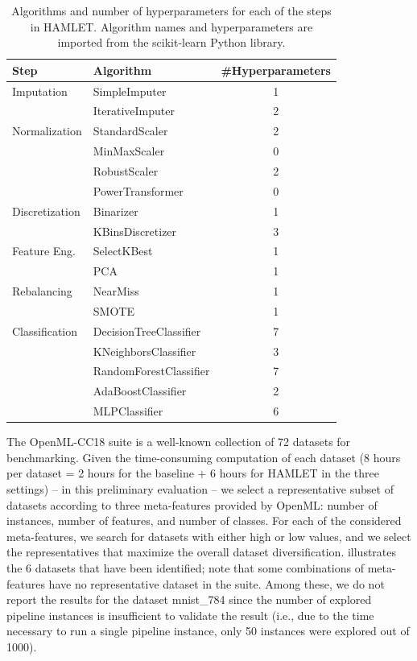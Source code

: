 \begin{table}[t]
    \footnotesize
    \caption{Algorithms and number of hyperparameters for each of the steps in HAMLET. Algorithm names and hyperparameters are imported from the scikit-learn Python library.}
    \centering
    \begin{tabular}{llc}
        \toprule
        \textbf{Step} & \textbf{Algorithm} & \textbf{\#Hyperparameters}  \\\midrule
        Imputation        & SimpleImputer & 1 \\
                          & IterativeImputer & 2 \\
        Normalization     & StandardScaler & 2 \\
                          & MinMaxScaler & 0 \\
                          & RobustScaler & 2 \\
                          & PowerTransformer & 0 \\
        Discretization    & Binarizer & 1 \\
                          & KBinsDiscretizer & 3 \\
        Feature Eng.      & SelectKBest & 1 \\
                          & PCA & 1 \\
        Rebalancing       & NearMiss & 1 \\
                          & SMOTE & 1 \\
        Classification    & DecisionTreeClassifier & 7 \\
                          & KNeighborsClassifier & 3 \\
                          & RandomForestClassifier & 7 \\
                          & AdaBoostClassifier & 2 \\
                          & MLPClassifier & 6 \\ \bottomrule
    \end{tabular}
    \label{hamlet-tbl:search_space}
\end{table}

The OpenML-CC18 suite is a well-known collection of 72 datasets for benchmarking.
Given the time-consuming computation of each dataset (8 hours per dataset = 2 hours for the baseline + 6 hours for HAMLET in the three settings) -- in this preliminary evaluation -- we select a representative subset of datasets according to three meta-features provided by OpenML: number of instances, number of features, and number of classes.
For each of the considered meta-features, we search for datasets with either high or low values, and we select the representatives that maximize the overall dataset diversification.
 illustrates the 6 datasets that have been identified; note that some combinations of meta-features have no representative dataset in the suite.
Among these, we do not report the results for the dataset mnist\_784 since the number of explored pipeline instances is insufficient to validate the result (i.e., due to the time necessary to run a single pipeline instance, only 50 instances were explored out of 1000).

